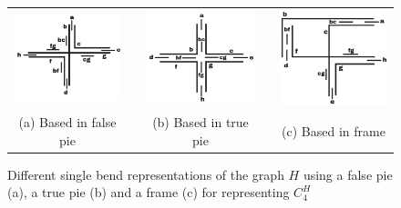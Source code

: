 \begin{figure}[htb]
  \centering
  \begin{tabular}{c c c c c }
    \includegraphics[width=4cm]{./img/falsePie.png}  %
    & &\includegraphics[width=4cm]{./img/truePie.png} %
    & &
 \includegraphics[width=4cm]{./img/frame.png} \\%
    {\footnotesize (a) Based in false pie}  & &  {\footnotesize(b) Based in true pie} & & {\footnotesize (c) Based in frame} %
  \end{tabular}
  \caption{Different single bend representations of the  graph $H$ using a false pie (a), a true pie (b) and a frame (c) for representing  $C_4^{H}$}\label{fig:falsepietruepieframe}
\end{figure} 